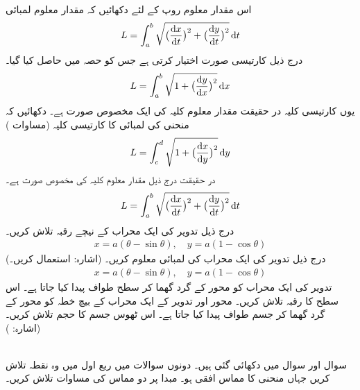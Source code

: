 اس مقدار معلوم روپ کے لئے دکھائیں کہ مقدار معلوم لمبائی
\begin{align*}
L=\int_a^b\sqrt{\big(\frac{\dif x}{\dif t}\big)^2+\big(\frac{\dif y}{\dif t}\big)^2}\dif t
\end{align*}
درج ذیل کارتیسی صورت اختیار کرتی ہے جس کو حصہ  میں حاصل کیا گیا۔
\begin{align*}
L=\int_a^b\sqrt{1+\big(\frac{\dif y}{\dif x}\big)^2}\dif x
\end{align*}
یوں کارتیسی کلیہ در حقیقت مقدار معلوم کلیہ کی ایک مخصوص صورت ہے۔
دکھائیں کہ منحنی  کی لمبائی کا کارتیسی کلیہ (مساوات )
\begin{align*}
L=\int_c^d\sqrt{1+\big(\frac{\dif x}{\dif y}\big)^2}\dif y
\end{align*}
در حقیقت درج ذیل مقدار  معلوم کلیہ کی مخصوص صورت ہے۔
\begin{align*}
L=\int_a^b\sqrt{\big(\frac{\dif x}{\dif t}\big)^2+\big(\frac{\dif y}{\dif t}\big)^2}\dif t
\end{align*}
درج ذیل تدویر کی ایک محراب کے نیچے رقبہ تلاش کریں۔
\begin{align*}
x=a(\theta-\sin\theta),\quad y=a(1-\cos\theta)
\end{align*} \quad
(اشارہ: استعمال کریں۔)
درج ذیل تدویر کی ایک محراب کی لمبائی معلوم کریں۔
\begin{align*}
x=a(\theta-\sin\theta),\quad y=a(1-\cos\theta)
\end{align*}
تدویر  کی ایک محراب کو محور  کے گرد گھما کر سطح طواف پیدا کیا جاتا ہے۔ اس سطح کا رقبہ تلاش کریں۔
محور  اور تدویر  کے ایک محراب کے بیچ خطہ کو محور  کے گرد گھما کر جسم طواف پیدا کیا جاتا ہے۔ اس ٹھوس جسم کا حجم تلاش کریں۔ (اشارہ: )

\\
سوال  اور سوال  میں  دکھائی گئی ہیں۔  دونوں سوالات میں ربع اول میں وہ نقطہ تلاش کریں جہاں منحنی کا مماس افقی ہو۔ مبدا پر دو مماس کی مساوات تلاش کریں۔

